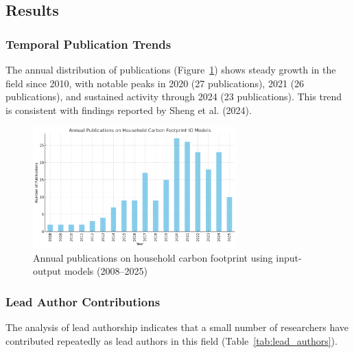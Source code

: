 \documentclass[12pt,a4paper]{article}%
\begin{document}
\subsection{Results}

\subsubsection{Temporal Publication Trends}

The annual distribution of publications (Figure~\ref{fig:Publications}) shows steady growth in the field since 2010, with notable peaks in 2020 (27 publications), 2021 (26 publications), and sustained activity through 2024 (23 publications). This trend is consistent with findings reported by Sheng et al. (2024).

\begin{figure}[h]
\centering
\includegraphics[width=0.7\textwidth]{Publications.png}
\caption{Annual publications on household carbon footprint using input-output models (2008--2025)}\label{fig:Publications}
\end{figure}

\subsubsection{Lead Author Contributions}

The analysis of lead authorship indicates that a small number of researchers have contributed repeatedly as lead authors in this field (Table~\ref{tab:lead_authors}). 
\end{document}
